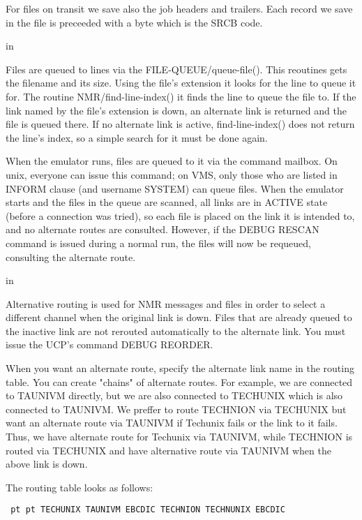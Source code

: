 For files on transit we save also the job headers and trailers.  Each
record  we  save  in the file is preceeded with a byte which is the SRCB
code.

 in

Files are queued  to  lines  via  the  FILE-QUEUE/queue-file().  This
reoutines  gets the filename and its size. Using the file's extension it
looks for the line to queue it for. The routine NMR/find-line-index() it
finds  the  line  to  queue the file to. If the link named by the file's
extension is down, an alternate link is returned and the file is  queued
there. If no alternate link is active, find-line-index() does not return
the line's index, so a simple search for it must be done again.

When the emulator runs, files  are  queued  to  it  via  the  command
mailbox.  On  unix,  everyone can issue this command; on VMS, only those
who are listed in INFORM clause (and username SYSTEM) can queue files.
When the emulator starts and the files in the queue are scanned,  all
links  are in ACTIVE state (before a connection was tried), so each file
is placed on the link it is intended to, and  no  alternate  routes  are
consulted.  However,  if  the  DEBUG RESCAN  command  is issued during a
normal run, the files will now be  requeued,  consulting  the  alternate
route.

 in

Alternative  routing  is  used for NMR messages and files in order to
select a different channel when the original link is  down.  Files  that
are  already  queued to the inactive link are not rerouted automatically
to the alternate link. You must issue the UCP's command DEBUG REORDER.

When you want an alternate route, specify the alternate link name  in
the  routing  table.  You  can  create "chains" of alternate routes. For
example, we are connected to TAUNIVM directly, but we are also connected
to  TECHUNIX  which  is  also  connected to TAUNIVM. We preffer to route
TECHNION via TECHUNIX  but  want  an  alternate  route  via  TAUNIVM  if
Techunix  fails  or  the link to it fails. Thus, we have alternate route
for Techunix via TAUNIVM, while TECHNION is routed via TECHUNIX and have
alternative route via TAUNIVM when the above link is down.

The routing table looks as follows:

{\obeylines\obeyspaces\tt{} pt  pt
TECHUNIX    TAUNIVM     EBCDIC
TECHNION    TECHNUNIX   EBCDIC
}

